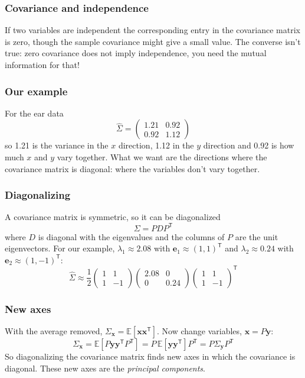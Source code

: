 \documentclass{beamer}
\begin{document}
\begin{frame}
\frametitle{Covariance and independence}
\vskip 0.25cm
If two variables are independent the corresponding entry in the covariance matrix is zero, though the sample covariance might give a small value.
\vskip 0.5cm
The converse isn't true: zero covariance does not imply independence, you need the mutual information for that!
\end{frame}

\begin{frame}
\frametitle{Our example}
\vskip 0.25cm
For the ear data
$$
\hat{\Sigma}=\begin{pmatrix}
1.21 & 0.92\\
0.92 & 1.12
\end{pmatrix}
$$
so 1.21 is the variance in the $x$ direction, 1.12 in the $y$ direction and 0.92 is how much $x$ and $y$ vary together.
\vskip 0.5cm
What we want are the directions where the covariance matrix is diagonal: where the variables don't vary together.
\end{frame}

\begin{frame}
\frametitle{Diagonalizing}
\vskip 0.25cm
A covariance matrix is symmetric, so it can be diagonalized
$$
\Sigma=PDP^{\mathsf T}
$$
where $D$ is diagonal with the eigenvalues and the columns of $P$ are the unit eigenvectors.
\vskip 0.5cm
For our example, $\lambda_1\approx 2.08$ with $\mathbf{e}_1\approx(1,1)^{\mathsf T}$ and $\lambda_2\approx 0.24$ with $\mathbf{e}_2\approx(1,-1)^{\mathsf T}$:
$$
\hat{\Sigma}\approx\frac{1}{2}
\begin{pmatrix}1 & 1\\1 & -1\end{pmatrix}
\begin{pmatrix}2.08 & 0\\0 & 0.24\end{pmatrix}
\begin{pmatrix}1 & 1\\1 & -1\end{pmatrix}^{\mathsf T}
$$
\end{frame}

\begin{frame}
\frametitle{New axes}
\vskip 0.25cm
With the average removed, $\Sigma_\mathbf{x}=\mathbb{E}[\mathbf{x}\mathbf{x}^{\mathsf T}]$. Now change variables, $\mathbf{x}=P\mathbf{y}$:
$$
\Sigma_\mathbf{x}
=\mathbb{E}\left[P\mathbf{y}\mathbf{y}^{\mathsf T}P^{\mathsf T}\right]
=P\,\mathbb{E}\left[\mathbf{y}\mathbf{y}^{\mathsf T}\right]P^{\mathsf T}
=P\Sigma_\mathbf{y}P^{\mathsf T}
$$
\vskip 0.25cm
So diagonalizing the covariance matrix finds new axes in which the covariance is diagonal. These new axes are the \emph{principal components}.
\end{frame}
\end{document}
